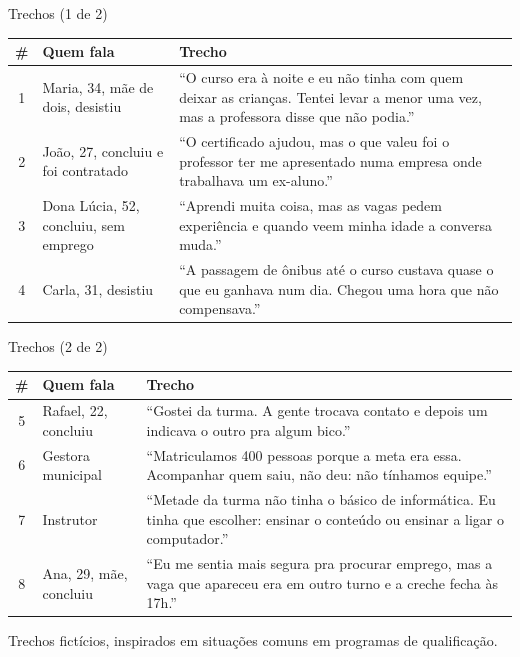 \begin{frame}{Trechos (1 de 2)}
  \scriptsize
  \renewcommand{\arraystretch}{1.3}
  \begin{tabularx}{\textwidth}{@{}c>{\raggedright\arraybackslash}p{2.4cm}>{\raggedright\arraybackslash}X@{}}
    \toprule
    \textbf{\#} & \textbf{Quem fala} & \textbf{Trecho} \\ \midrule
    1 & Maria, 34, mãe de dois, desistiu & ``O curso era à noite e eu não tinha com quem deixar as crianças. Tentei levar a menor uma vez, mas a professora disse que não podia.'' \\
    2 & João, 27, concluiu e foi contratado & ``O certificado ajudou, mas o que valeu foi o professor ter me apresentado numa empresa onde trabalhava um ex-aluno.'' \\
    3 & Dona Lúcia, 52, concluiu, sem emprego & ``Aprendi muita coisa, mas as vagas pedem experiência e quando veem minha idade a conversa muda.'' \\
    4 & Carla, 31, desistiu & ``A passagem de ônibus até o curso custava quase o que eu ganhava num dia. Chegou uma hora que não compensava.'' \\ \bottomrule
  \end{tabularx}
\end{frame}

\begin{frame}{Trechos (2 de 2)}
  \scriptsize
  \renewcommand{\arraystretch}{1.3}
  \begin{tabularx}{\textwidth}{@{}c>{\raggedright\arraybackslash}p{2.4cm}>{\raggedright\arraybackslash}X@{}}
    \toprule
    \textbf{\#} & \textbf{Quem fala} & \textbf{Trecho} \\ \midrule
    5 & Rafael, 22, concluiu & ``Gostei da turma. A gente trocava contato e depois um indicava o outro pra algum bico.'' \\
    6 & Gestora municipal & ``Matriculamos 400 pessoas porque a meta era essa. Acompanhar quem saiu, não deu: não tínhamos equipe.'' \\
    7 & Instrutor & ``Metade da turma não tinha o básico de informática. Eu tinha que escolher: ensinar o conteúdo ou ensinar a ligar o computador.'' \\
    8 & Ana, 29, mãe, concluiu & ``Eu me sentia mais segura pra procurar emprego, mas a vaga que apareceu era em outro turno e a creche fecha às 17h.'' \\ \bottomrule
  \end{tabularx}\par
  \vspace{0.2cm}\tiny Trechos fictícios, inspirados em situações comuns em programas de qualificação.
\end{frame}
